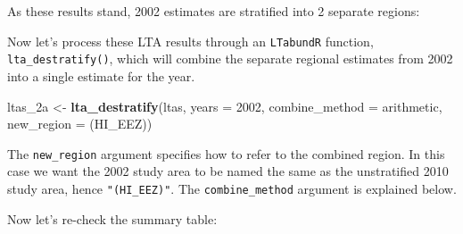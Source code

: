 \documentclass[
]{book}
\newenvironment{Shaded}{\begin{snugshade}}{\end{snugshade}}
\newcommand{\AttributeTok}[1]{\textcolor[rgb]{0.13,0.29,0.53}{#1}}
\newcommand{\ConstantTok}[1]{\textcolor[rgb]{0.56,0.35,0.01}{#1}}
\newcommand{\ControlFlowTok}[1]{\textcolor[rgb]{0.13,0.29,0.53}{\textbf{#1}}}
\newcommand{\DecValTok}[1]{\textcolor[rgb]{0.00,0.00,0.81}{#1}}
\newcommand{\FunctionTok}[1]{\textcolor[rgb]{0.13,0.29,0.53}{\textbf{#1}}}
\newcommand{\NormalTok}[1]{#1}
\newcommand{\OtherTok}[1]{\textcolor[rgb]{0.56,0.35,0.01}{#1}}
\newcommand{\SpecialCharTok}[1]{\textcolor[rgb]{0.81,0.36,0.00}{\textbf{#1}}}
\newcommand{\StringTok}[1]{\textcolor[rgb]{0.31,0.60,0.02}{#1}}
\begin{document}
As these results stand, 2002 estimates are stratified into 2 separate regions:

\begin{Shaded}
\end{Shaded}

Now let's process these LTA results through an \texttt{LTabundR} function, \texttt{lta\_destratify()}, which will combine the separate regional estimates from 2002 into a single estimate for the year.

\begin{Shaded}
\begin{Highlighting}[]
\NormalTok{ltas\_2a }\OtherTok{\textless{}{-}}
  \FunctionTok{lta\_destratify}\NormalTok{(ltas,}
               \AttributeTok{years =} \DecValTok{2002}\NormalTok{,}
               \AttributeTok{combine\_method =} \StringTok{\textquotesingle{}arithmetic\textquotesingle{}}\NormalTok{,}
               \AttributeTok{new\_region =} \StringTok{\textquotesingle{}(HI\_EEZ)\textquotesingle{}}\NormalTok{)}
\end{Highlighting}
\end{Shaded}

The \texttt{new\_region} argument specifies how to refer to the combined region. In this case we want the 2002 study area to be named the same as the unstratified 2010 study area, hence \texttt{"(HI\_EEZ)"}. The \texttt{combine\_method} argument is explained below.

Now let's re-check the summary table:

\begin{Shaded}
\end{Shaded}
\end{document}
